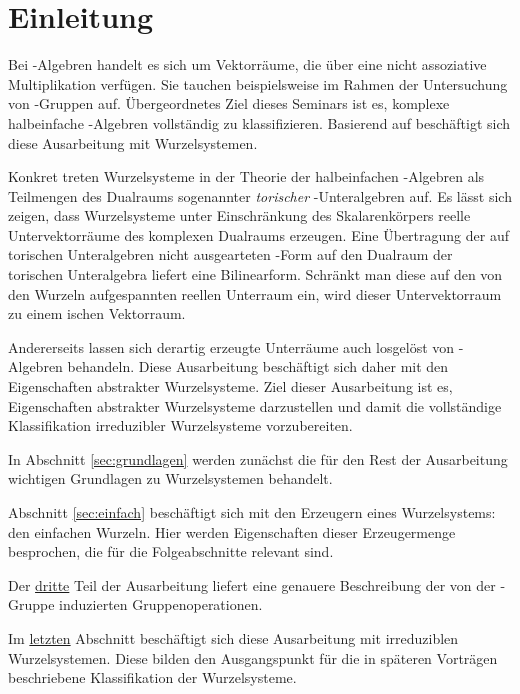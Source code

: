 \section*{Einleitung}

Bei \lie\hyp{}Algebren handelt es sich um Vektorräume, die über eine nicht assoziative Multiplikation verfügen.
Sie tauchen beispielsweise im Rahmen der Untersuchung von \lie\hyp{}Gruppen auf.
Übergeordnetes Ziel dieses Seminars ist es, komplexe halbeinfache \lie\hyp{}Algebren vollständig zu klassifizieren.
Basierend auf \cite[S.49-55]{humphreys1972introduction} beschäftigt sich diese Ausarbeitung mit Wurzelsystemen.

Konkret treten Wurzelsysteme in der Theorie der halbeinfachen \lie\hyp{}Algebren als Teilmengen des Dualraums sogenannter \emph{torischer} \lie\hyp{}Unteralgebren auf.
Es lässt sich zeigen, dass Wurzelsysteme unter Einschränkung des Skalarenkörpers reelle Untervektorräume des komplexen Dualraums erzeugen.
Eine Übertragung der auf torischen Unteralgebren nicht ausgearteten \killing\hyp{}Form auf den Dualraum der torischen Unteralgebra liefert eine Bilinearform.
Schränkt man diese auf den von den Wurzeln aufgespannten reellen Unterraum ein, wird dieser Untervektorraum zu einem \euklid ischen Vektorraum.

Andererseits lassen sich derartig erzeugte Unterräume auch losgelöst von \lie\hyp{}Algebren behandeln.
Diese Ausarbeitung beschäftigt sich daher mit den Eigenschaften abstrakter Wurzelsysteme.
Ziel dieser Ausarbeitung ist es, Eigenschaften abstrakter Wurzelsysteme darzustellen und damit die vollständige Klassifikation irreduzibler Wurzelsysteme vorzubereiten.

In Abschnitt \ref{sec:grundlagen} werden zunächst die für den Rest der Ausarbeitung wichtigen Grundlagen zu Wurzelsystemen behandelt.

Abschnitt \ref{sec:einfach} beschäftigt sich mit den Erzeugern eines Wurzelsystems: den einfachen Wurzeln. 
Hier werden Eigenschaften dieser Erzeugermenge besprochen, die für die Folgeabschnitte relevant sind.

Der \hyperref[sec:weylgroup]{dritte} Teil der Ausarbeitung liefert eine genauere Beschreibung der von der \weyl\hyp{}Gruppe induzierten Gruppenoperationen.

Im \hyperref[sec:irreduc]{letzten} Abschnitt beschäftigt sich diese Ausarbeitung mit irreduziblen Wurzelsystemen. 
Diese bilden den Ausgangspunkt für die in späteren Vorträgen beschriebene Klassifikation der Wurzelsysteme.
